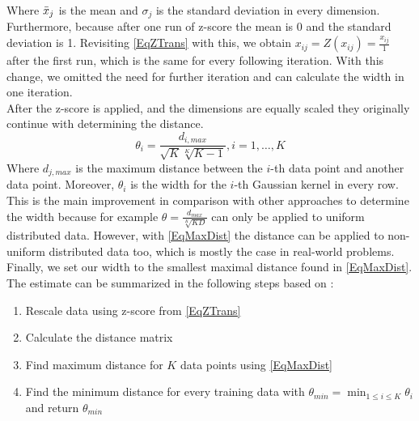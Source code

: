 Where $\bar{x}_j$ is the mean and $\sigma_j$ is the standard deviation in every dimension.\\
Furthermore, because after one run of z-score the mean is 0 and the standard deviation is 1.\cite{Mohamad.2013}
Revisiting \eqref{EqZTrans} with this, we obtain $x_{ij} = Z(x_{ij}) = \frac{x_{ij}}{1}$ after the first run, which is the same for every following iteration.
With this change, we omitted the need for further iteration and can calculate the width in one iteration.\\
After the z-score is applied, and the dimensions are equally scaled they originally continue with determining the distance.\cite{Kitayama.2011}
\begin{equation}\label{EqMaxDist}
	\theta_i = \frac{d_{i,max}}{\sqrt{K}\sqrt[K]{K-1}}, i=1,\dots,K
\end{equation}
Where $d_{j,max}$ is the maximum distance between the $i$-th data point and another data point.
Moreover, $\theta_i$ is the width for the $i$-th Gaussian kernel in every row.\\
This is the main improvement in comparison with other approaches to determine the width because for example $\theta =\frac{d_{max}}{\sqrt[K]{KD}}$ can only be applied to uniform distributed data.
However, with \eqref{EqMaxDist} the distance can be applied to non-uniform distributed data too, which is mostly the case in real-world problems.\cite{Kitayama.2011}\newline
Finally, we set our width to the smallest maximal distance found in \eqref{EqMaxDist}.
The estimate can be summarized in the following steps based on \cite{Kitayama.2011}:
\begin{enumerate}[label=\bfseries Step \arabic*:,leftmargin=*,labelindent=1em]
	\item Rescale data using z-score from \eqref{EqZTrans}
	\item Calculate the distance matrix
	\item Find maximum distance for $K$ data points using \eqref{EqMaxDist}
	\item Find the minimum distance for every training data with $\displaystyle\theta_{min}=\min_{1 \le i \le K}\theta_i$ and return $\theta_{min}$
\end{enumerate}
